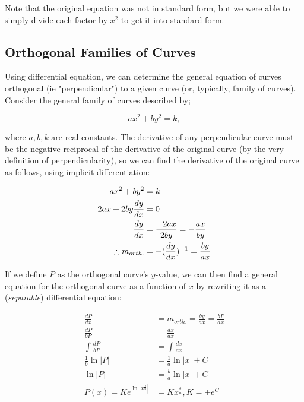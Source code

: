 \documentclass[12pt]{article}
\begin{document}
Note that the original equation was not in standard form, but we were able to simply divide each factor by $x^2$ to get it into standard form.

\subsection*{Orthogonal Families of Curves}

Using differential equation, we can determine the general equation of curves orthogonal (ie "perpendicular") to a given curve (or, typically, family of curves). Consider the general family of curves described by;

$$ax^2+by^2=k,$$

where $a,b,k$ are real constants. The derivative of any perpendicular curve must be the negative reciprocal of the derivative of the original curve (by the very definition of perpendicularity), so we can find the derivative of the original curve as follows, using implicit differentiation:

\begin{equation}
    \begin{split}
        ax^2+by^2 &= k\\
        2ax + 2by\frac{dy}{dx} &= 0\\
        \frac{dy}{dx} &= \frac{-2ax}{2by} = -\frac{ax}{by}\\
        \therefore m_{orth.} &= -(\frac{dy}{dx})^{-1} = \frac{by}{ax}\\
    \end{split}
\end{equation}

If we define $P$ as the orthogonal curve's $y$-value, we can then find a general equation for the orthogonal curve as a function of $x$ by rewriting it as a (\textit{separable}) differential equation:

\begin{equation}
    \begin{split}
        \frac{dP}{dx} &= m_{orth.} = \frac{by}{ax} = \frac{bP}{ax}\\
        \frac{dP}{bP} &= \frac{dx}{ax}\\
        \int \frac{dP}{bP} &= \int \frac{dx}{ax}\\
        \frac{1}{b}\ln |P| &= \frac{1}{a}\ln |x| + C\\
        \ln |P| &= \frac{b}{a}\ln|x|+C\\
        P(x) = Ke^{\ln |x^{\frac{b}{a}}|} &= Kx^{\frac{b}{a}}, K = \pm e^{C}\\
    \end{split}
\end{equation}
\end{document}
